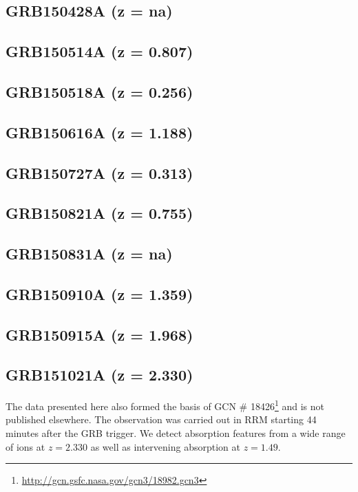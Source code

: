 \documentclass{aa}    %
\begin{document}
\subsection{GRB150428A (z = na)}	



\subsection{GRB150514A (z = 0.807)}	



\subsection{GRB150518A (z = 0.256)}	



\subsection{GRB150616A (z = 1.188)}	



\subsection{GRB150727A (z = 0.313)}	



\subsection{GRB150821A (z = 0.755)}	



\subsection{GRB150831A (z = na)}	



\subsection{GRB150910A (z = 1.359)}	



\subsection{GRB150915A (z = 1.968)}	



\subsection{GRB151021A (z = 2.330)}
The data presented here also formed the basis of GCN \#
18426\footnote{\url{http://gcn.gsfc.nasa.gov/gcn3/18982.gcn3}} and is not
published elsewhere. The observation was carried out in RRM starting 44 minutes
after the GRB trigger. We detect absorption features from a wide range of ions
at $z=2.330$ as well as intervening absorption at $z=1.49$.
\end{document}
